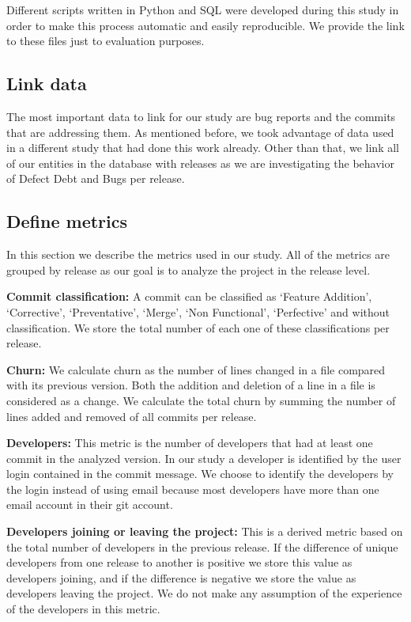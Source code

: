 Different scripts written in Python and SQL were developed during this study in order to make this process automatic and easily reproducible. We provide the link to these files just to evaluation purposes.

\subsection{Link data}

The most important data to link for our study are bug reports and the commits that are addressing them. As mentioned before, we took advantage of data used in a different study that had done this work already. Other than that, we link all of our entities in the database with releases as we are investigating the behavior of Defect Debt and Bugs per release. 

\subsection{Define metrics}

In this section we describe the metrics used in our study. All of the metrics are grouped by release as our goal is to analyze the project in the release level. 

\textbf{Commit classification:} A commit can be classified as `Feature Addition', `Corrective', `Preventative', `Merge', `Non Functional', `Perfective' and without classification. We store the total number of each one of these classifications per release. %

\textbf{Churn:} We calculate churn as the number of lines changed in a file compared with its previous version. Both the addition and deletion of a line in a file is considered as a change. We calculate the total churn by summing the number of lines added and removed of all commits per release. %

\textbf{Developers:} This metric is the number of developers that had at least one commit in the analyzed version. In our study a developer is identified by the user login contained in the commit message. We choose to identify the developers by the login instead of using email because most developers have more than one email account in their git account. 

\textbf{Developers joining or leaving the project:} This is a derived metric based on the total number of developers in the previous release. If the difference of unique developers from one release to another is positive we store this value as developers joining, and if the difference is negative we store the value as developers leaving the project. We do not make any assumption of the experience of the developers in this metric.

